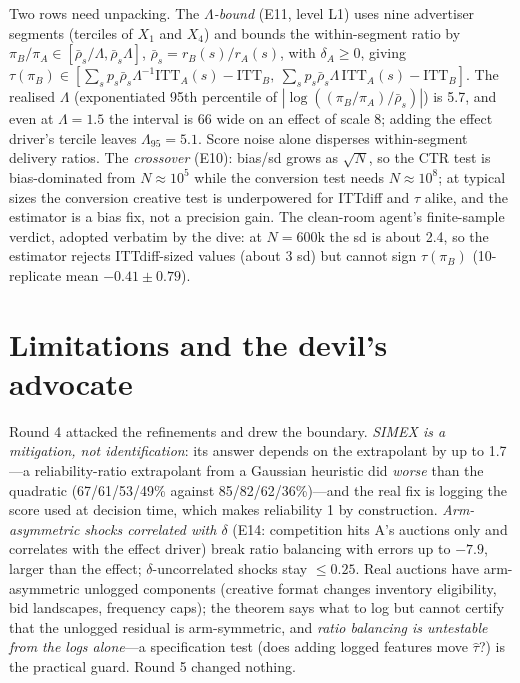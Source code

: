Two rows need unpacking. The \emph{$\Lambda$-bound} (E11, level L1) uses nine advertiser segments (terciles of $X_1$ and $X_4$) and bounds the within-segment ratio by $\pi_B/\pi_A \in [\bar\rho_s/\Lambda, \bar\rho_s\Lambda]$, $\bar\rho_s = r_B(s)/r_A(s)$, with $\delta_A \ge 0$, giving $\tau(\pi_B) \in [\sum_s p_s\bar\rho_s\Lambda^{-1}\mathrm{ITT}_A(s) - \mathrm{ITT}_B,\ \sum_s p_s\bar\rho_s\Lambda\,\mathrm{ITT}_A(s) - \mathrm{ITT}_B]$. The realised $\Lambda$ (exponentiated 95th percentile of $|\log((\pi_B/\pi_A)/\bar\rho_s)|$) is 5.7, and even at $\Lambda = 1.5$ the interval is 66 wide on an effect of scale 8; adding the effect driver's tercile leaves $\Lambda_{95} = 5.1$. Score noise alone disperses within-segment delivery ratios. The \emph{crossover} (E10): bias/sd grows as $\sqrt N$, so the CTR test is bias-dominated from $N \approx 10^5$ while the conversion test needs $N \approx 10^8$; at typical sizes the conversion creative test is underpowered for ITTdiff and $\tau$ alike, and the estimator is a bias fix, not a precision gain. The clean-room agent's finite-sample verdict, adopted verbatim by the dive: at $N = 600$k the sd is about 2.4, so the estimator rejects ITTdiff-sized values (about 3 sd) but cannot sign $\tau(\pi_B)$ (10-replicate mean $-0.41 \pm 0.79$).

\section{Limitations and the devil's advocate}

Round 4 attacked the refinements and drew the boundary. \emph{SIMEX is a mitigation, not identification}: its answer depends on the extrapolant by up to 1.7---a reliability-ratio extrapolant from a Gaussian heuristic did \emph{worse} than the quadratic (67/61/53/49\% against 85/82/62/36\%)---and the real fix is logging the score used at decision time, which makes reliability 1 by construction. \emph{Arm-asymmetric shocks correlated with $\delta$} (E14: competition hits A's auctions only and correlates with the effect driver) break ratio balancing with errors up to $-7.9$, larger than the effect; $\delta$-uncorrelated shocks stay $\le 0.25$. Real auctions have arm-asymmetric unlogged components (creative format changes inventory eligibility, bid landscapes, frequency caps); the theorem says what to log but cannot certify that the unlogged residual is arm-symmetric, and \emph{ratio balancing is untestable from the logs alone}---a specification test (does adding logged features move $\hat\tau$?) is the practical guard. Round 5 changed nothing.

